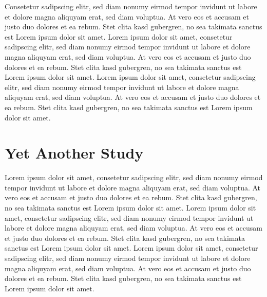Consetetur sadipscing elitr,  sed diam nonumy eirmod tempor invidunt ut labore
et dolore magna aliquyam erat, sed diam voluptua. At vero eos et accusam et
justo duo dolores et ea rebum. Stet clita kasd gubergren, no sea takimata
sanctus est Lorem ipsum dolor sit amet. Lorem ipsum dolor sit amet, consetetur
sadipscing elitr,  sed diam nonumy eirmod tempor invidunt ut labore et dolore
magna aliquyam erat, sed diam voluptua. At vero eos et accusam et justo duo
dolores et ea rebum. Stet clita kasd gubergren, no sea takimata sanctus est
Lorem ipsum dolor sit amet. Lorem ipsum dolor sit amet, consetetur sadipscing
elitr,  sed diam nonumy eirmod tempor invidunt ut labore et dolore magna
aliquyam erat, sed diam voluptua. At vero eos et accusam et justo duo dolores
et ea rebum. Stet clita kasd gubergren, no sea takimata sanctus est Lorem ipsum
dolor sit amet.

\section{Yet Another Study}
Lorem ipsum dolor sit amet, consetetur sadipscing elitr,  sed diam nonumy eirmod
tempor invidunt ut labore et dolore magna aliquyam erat, sed diam voluptua. At
vero eos et accusam et justo duo dolores et ea rebum. Stet clita kasd gubergren,
no sea takimata sanctus est Lorem ipsum dolor sit amet. Lorem ipsum dolor sit
amet, consetetur sadipscing elitr,  sed diam nonumy eirmod tempor invidunt ut
labore et dolore magna aliquyam erat, sed diam voluptua. At vero eos et accusam
et justo duo dolores et ea rebum. Stet clita kasd gubergren, no sea takimata
sanctus est Lorem ipsum dolor sit amet. Lorem ipsum dolor sit amet, consetetur
sadipscing elitr,  sed diam nonumy eirmod tempor invidunt ut labore et dolore
magna aliquyam erat, sed diam voluptua. At vero eos et accusam et justo duo
dolores et ea rebum. Stet clita kasd gubergren, no sea takimata sanctus est
Lorem ipsum dolor sit amet.

